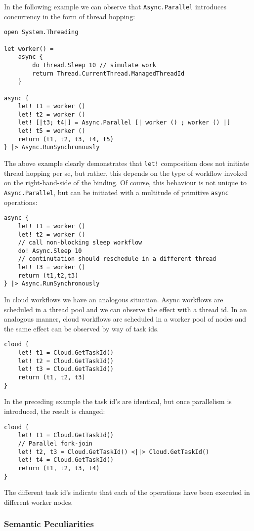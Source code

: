 In the following example we can observe that \texttt{Async.Parallel} introduces concurrency 
in the form of thread hopping:
\begin{lstlisting}
open System.Threading
 
let worker() = 
    async { 
        do Thread.Sleep 10 // simulate work
        return Thread.CurrentThread.ManagedThreadId 
    }
 
async {
    let! t1 = worker ()
    let! t2 = worker ()
    let! [|t3; t4|] = Async.Parallel [| worker () ; worker () |]
    let! t5 = worker ()
    return (t1, t2, t3, t4, t5)
} |> Async.RunSynchronously
\end{lstlisting}
The above example clearly demonstrates that \texttt{let!} composition does not
initiate thread hopping per se, but rather, this depends on the type of workflow
invoked on the right-hand-side of the binding. Of course, this behaviour is not
unique to \texttt{Async.Parallel}, but can be initiated with a multitude of
primitive \texttt{async} operations:
\begin{lstlisting}
async {
    let! t1 = worker ()
    let! t2 = worker ()
    // call non-blocking sleep workflow
    do! Async.Sleep 10
    // continutation should reschedule in a different thread
    let! t3 = worker ()
    return (t1,t2,t3)
} |> Async.RunSynchronously
\end{lstlisting}
In cloud workflows we have an analogous situation. Async workflows are scheduled in 
a thread pool and we can observe the effect with a thread id.
In an analogous manner, cloud workflows are scheduled in a worker pool of nodes 
and the same effect can be observed by way of task ids.
\begin{lstlisting}
cloud {
    let! t1 = Cloud.GetTaskId()
    let! t2 = Cloud.GetTaskId()
    let! t3 = Cloud.GetTaskId()
    return (t1, t2, t3)
} 
\end{lstlisting}
In the preceding example the task id's are identical, but once parallelism
is introduced, the result is changed:
\begin{lstlisting}
cloud {
    let! t1 = Cloud.GetTaskId()
    // Parallel fork-join
    let! t2, t3 = Cloud.GetTaskId() <||> Cloud.GetTaskId()
    let! t4 = Cloud.GetTaskId()
    return (t1, t2, t3, t4)
} 
\end{lstlisting}
The different task id's indicate that each of the operations have been executed
in different worker nodes.

\label{peculiarities}
\subsubsection*{Semantic Peculiarities}

